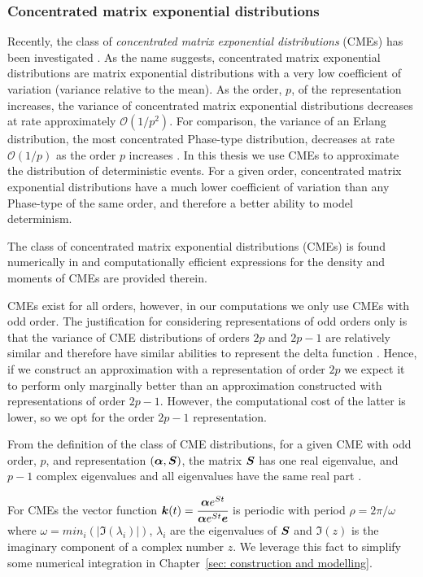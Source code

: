 \subsubsection*{Concentrated matrix exponential distributions}
Recently, the class of \emph{concentrated matrix exponential distributions} (CMEs) has been investigated \citep{ert2006,hstz2016,ert2006,hht2020,mt2021}. As the name suggests, concentrated matrix exponential distributions are matrix exponential distributions with a very low coefficient of variation (variance relative to the mean). As the order, \(p\), of the representation increases, the variance of concentrated matrix exponential distributions decreases at rate approximately \(\mathcal O(1/p^2)\). For comparison, the variance of an Erlang distribution, the most concentrated Phase-type distribution, decreases at rate \(\mathcal O(1/p)\) as the order \(p\) increases \citep{as1987}. In this thesis we use CMEs to approximate the distribution of deterministic events. For a given order, concentrated matrix exponential distributions have a much lower coefficient of variation than any Phase-type of the same order, and therefore a better ability to model determinism. 

The class of concentrated matrix exponential distributions (CMEs) is found numerically in \citep{hht2020} and computationally efficient expressions for the density and moments of CMEs are provided therein. 

CMEs exist for all orders, however, in our computations we only use CMEs with odd order. The justification for considering representations of odd orders only is that the variance of CME distributions of orders \(2p\) and \(2p-1\) are relatively similar and therefore have similar abilities to represent the delta function \citep{hht2020}. Hence, if we construct an approximation with a representation of order \(2p\) we expect it to perform only marginally better than an approximation constructed with representations of order \(2p-1\). However, the computational cost of the latter is lower, so we opt for the order \(2p-1\) representation. 

From the definition of the class of CME distributions, for a given CME with odd order, \(p\), and representation \((\boldsymbol\alpha,\boldsymbol S)\), the matrix \(\boldsymbol S\) has one real eigenvalue, and \(p-1\) complex eigenvalues and all eigenvalues have the same real part \citep{hht2020}. 

For CMEs the vector function \(\boldsymbol k(t)=\cfrac{\boldsymbol \alpha e^{St}}{\boldsymbol \alpha e^{St}\boldsymbol e}\) is periodic with period \(\rho = 2\pi/\omega\) where \(\omega=min_i(|\Im(\lambda_i)|)\), \(\lambda_i\) are the eigenvalues of \(\boldsymbol{S}\) and \(\Im(z)\) is the imaginary component of a complex number \(z\). We leverage this fact to simplify some numerical integration in Chapter~\ref{sec: construction and modelling}. 


